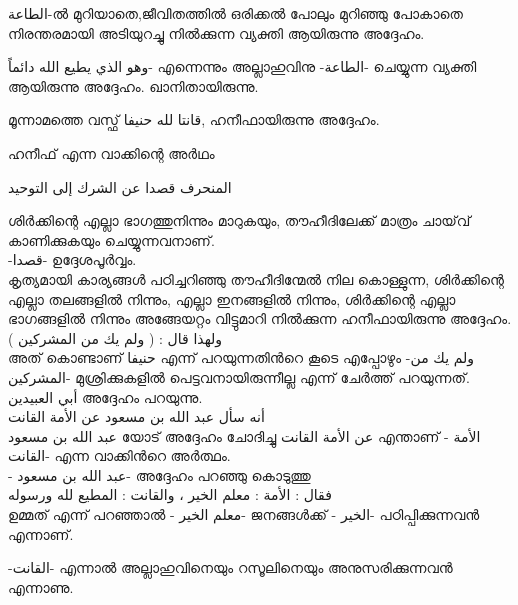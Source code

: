      \textarabic{الطاعة}-ൽ മുറിയാതെ,ജീവിതത്തിൽ ഒരിക്കൽ പോലും മുറിഞ്ഞു പോകാതെ നിരന്തരമായി അടിയുറച്ചു നിൽക്കുന്ന വ്യക്തി ആയിരുന്നു അദ്ദേഹം. 

\textarabic{وهو الذي يطيع الله دائماً}- എന്നെന്നും അല്ലാഹുവിനു -\textarabic{الطاعة}- ചെയ്യുന്ന വ്യക്തി ആയിരുന്നു അദ്ദേഹം. ഖാനിതായിരുന്നു. \\

  \textarabic{\quranayah[16][120]} 
  
  മൂന്നാമത്തെ വസ്ഫ് \textarabic{ قانتا لله حنيفا},  ഹനീഫായിരുന്നു അദ്ദേഹം. 
  
  ഹനീഫ് എന്ന വാക്കിന്റെ അർഥം 
  
  \textarabic{المنحرف قصدا عن الشرك إلى التوحيد}

  
  ശിർക്കിന്റെ എല്ലാ ഭാഗത്തുനിന്നും മാറുകയും, തൗഹീദിലേക്ക് മാത്രം ചായ്‌വ് കാണിക്കുകയും ചെയ്യുന്നവനാണ്. \\
  -\textarabic{قصدا}- ഉദ്ദേശപൂർവ്വം. \\
  കൃത്യമായി കാര്യങ്ങൾ പഠിച്ചറിഞ്ഞു തൗഹീദിന്മേൽ നില കൊള്ളുന്ന, ശിർക്കിന്റെ എല്ലാ തലങ്ങളിൽ നിന്നും, എല്ലാ ഇനങ്ങളിൽ നിന്നും, ശിർക്കിന്റെ എല്ലാ ഭാഗങ്ങളിൽ നിന്നും അങ്ങേയറ്റം വിട്ടുമാറി നിൽക്കുന്ന ഹനീഫായിരുന്നു അദ്ദേഹം. \\
  
  
 \textarabic{ولهذا قال : ( ولم يك من المشركين )} \\
  അത് കൊണ്ടാണ്‌  \textarabic{حنيفا} എന്ന് പറയുന്നതിൻറെ കൂടെ എപ്പോഴും  -\textarabic{ولم يك من المشركين}- മുശ്രിക്കുകളിൽ പെട്ടവനായിരുന്നീല്ല എന്ന് ചേർത്ത് പറയുന്നത്. 
  \\
  
 
 \textarabic{ أبي العبيدين} അദ്ദേഹം പറയുന്നു. \\
 \textarabic{أنه سأل عبد الله بن مسعود عن الأمة القانت} \\
 \textarabic{عبد الله بن مسعود} യോട് അദ്ദേഹം ചോദിച്ചു 
  \textarabic{ عن الأمة القانت}
  എന്താണ് -  \textarabic{  الأمة القانت}- എന്ന വാക്കിൻറെ അർത്ഥം. \\
 - \textarabic{عبد الله بن مسعود}- അദ്ദേഹം പറഞ്ഞു കൊടുത്തു \\
  \textarabic{فقال : الأمة : معلم الخير ، والقانت : المطيع لله ورسوله } \\
  ഉമ്മത് എന്ന് പറഞ്ഞാൽ -\textarabic{ معلم الخير}- 
  ജനങ്ങൾക്ക് -\textarabic{ الخير}- പഠിപ്പിക്കുന്നവൻ എന്നാണ്. 
  
  -\textarabic{القانت}- എന്നാൽ അല്ലാഹുവിനെയും റസൂലിനെയും അനുസരിക്കുന്നവൻ എന്നാണു. \\
 
 
 
